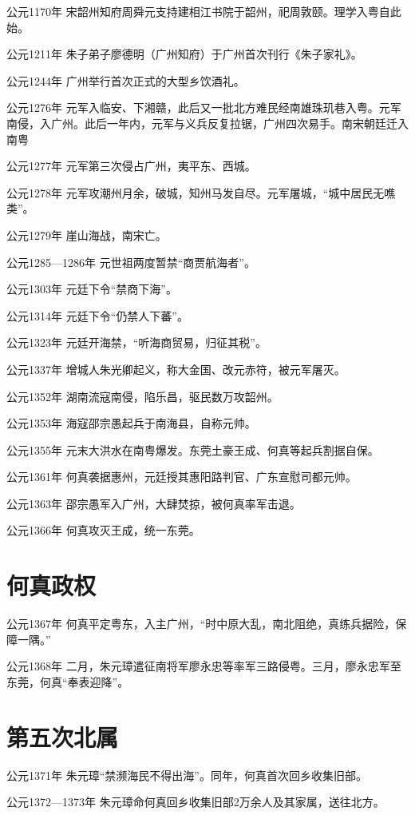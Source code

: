 公元1170年 宋韶州知府周舜元支持建相江书院于韶州，祀周敦颐。理学入粤自此始。

公元1211年 朱子弟子廖德明（广州知府）于广州首次刊行《朱子家礼》。

公元1244年 广州举行首次正式的大型乡饮酒礼。

公元1276年 元军入临安、下湘赣，此后又一批北方难民经南雄珠玑巷入粤。元军南侵，入广州。此后一年内，元军与义兵反复拉锯，广州四次易手。南宋朝廷迁入南粤

公元1277年 元军第三次侵占广州，夷平东、西城。

公元1278年 元军攻潮州月余，破城，知州马发自尽。元军屠城，“城中居民无噍类”。

公元1279年 崖山海战，南宋亡。

公元1285—1286年 元世祖两度暂禁“商贾航海者”。

公元1303年 元廷下令“禁商下海”。

公元1314年 元廷下令“仍禁人下蕃”。

公元1323年 元廷开海禁，“听海商贸易，归征其税”。

公元1337年 增城人朱光卿起义，称大金国、改元赤符，被元军屠灭。

公元1352年 湖南流寇南侵，陷乐昌，驱民数万攻韶州。

公元1353年 海寇邵宗愚起兵于南海县，自称元帅。

公元1355年 元末大洪水在南粤爆发。东莞土豪王成、何真等起兵割据自保。

公元1361年 何真袭据惠州，元廷授其惠阳路判官、广东宣慰司都元帅。

公元1363年 邵宗愚军入广州，大肆焚掠，被何真率军击退。

公元1366年 何真攻灭王成，统一东莞。

\section*{何真政权}

公元1367年 何真平定粤东，入主广州，“时中原大乱，南北阻绝，真练兵据险，保障一隅。”

公元1368年 二月，朱元璋遣征南将军廖永忠等率军三路侵粤。三月，廖永忠军至东莞，何真“奉表迎降”。


\section*{第五次北属}

公元1371年 朱元璋“禁濒海民不得出海”。同年，何真首次回乡收集旧部。

公元1372—1373年 朱元璋命何真回乡收集旧部2万余人及其家属，送往北方。

